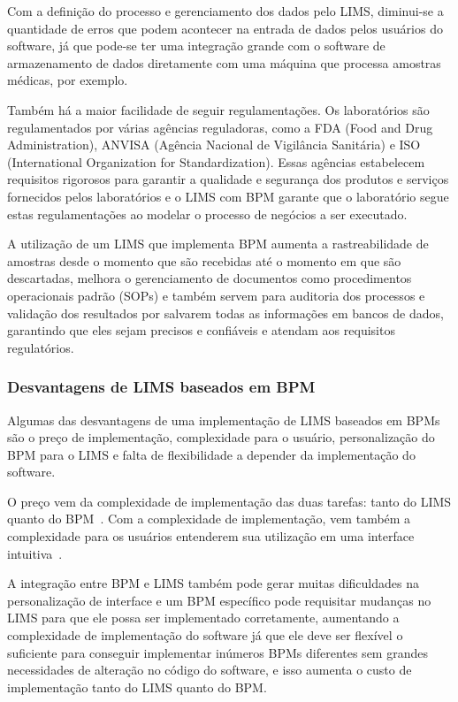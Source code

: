 Com a definição do processo e gerenciamento dos dados pelo LIMS, diminui-se a quantidade de erros que podem acontecer na entrada de dados pelos usuários do software, já que pode-se ter uma integração grande com o software de armazenamento de dados diretamente com uma máquina que processa amostras médicas, por exemplo.

Também há a maior facilidade de seguir regulamentações. Os laboratórios são regulamentados por várias agências reguladoras, como a FDA (Food and Drug Administration), ANVISA (Agência Nacional de Vigilância Sanitária) e ISO (International Organization for Standardization). Essas agências estabelecem requisitos rigorosos para garantir a qualidade e segurança dos produtos e serviços fornecidos pelos laboratórios e o LIMS com BPM garante que o laboratório segue estas regulamentações ao modelar o processo de negócios a ser executado.

A utilização de um LIMS que implementa BPM aumenta a rastreabilidade de amostras desde o momento que são recebidas até o momento em que são descartadas, melhora o gerenciamento de documentos como procedimentos operacionais padrão (SOPs) e também servem para auditoria dos processos e validação dos resultados por salvarem todas as informações em bancos de dados, garantindo que eles sejam precisos e confiáveis e atendam aos requisitos regulatórios.


\subsubsection{Desvantagens de LIMS baseados em BPM}

Algumas das desvantagens de uma implementação de LIMS baseados em BPMs são o preço de implementação, complexidade para o usuário, personalização do BPM para o LIMS e falta de flexibilidade a depender da implementação do software.

O preço vem da complexidade de implementação das duas tarefas: tanto do LIMS quanto do BPM~\cite{Mutschler2013UnderstandingTechnology}. Com a complexidade de implementação, vem também a complexidade para os usuários entenderem sua utilização em uma interface intuitiva~\cite{Cardoso2006AModels}.

A integração entre BPM e LIMS também pode gerar muitas dificuldades na personalização de interface e um BPM específico pode requisitar mudanças no LIMS para que ele possa ser implementado corretamente, aumentando a complexidade de implementação do software já que ele deve ser flexível o suficiente para conseguir implementar inúmeros BPMs diferentes sem grandes necessidades de alteração no código do software, e isso aumenta o custo de implementação tanto do LIMS quanto do BPM.